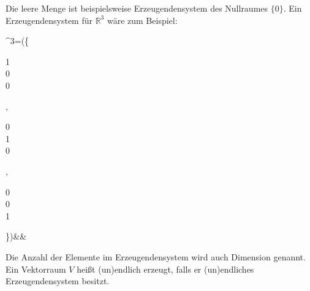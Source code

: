 \documentclass[12pt]{article}
\begin{document}
		\noindent Die leere Menge ist beispielsweise Erzeugendensystem des Nullraumes $\{0\}$. Ein Erzeugendensystem für $\mathbb{R}^3$ wäre zum Beispiel:
		\begin{flalign*}
			^3=\left(\left\{\begin{pmatrix}
			1\\0\\0
			\end{pmatrix},\begin{pmatrix}
			0\\1\\0
			\end{pmatrix},\begin{pmatrix}
			0\\0\\1
			\end{pmatrix}\right\}\right)&&
		\end{flalign*}
		Die Anzahl der Elemente im Erzeugendensystem wird auch Dimension genannt. Ein Vektorraum $V$ heißt (un)endlich erzeugt, falls er (un)endliches Erzeugendensystem besitzt.
\end{document}
